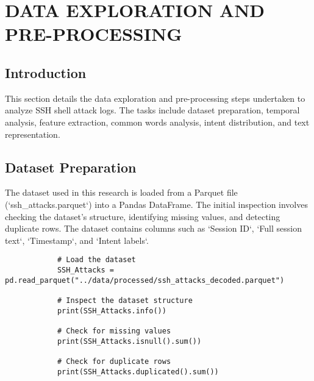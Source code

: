 

\section{DATA EXPLORATION AND PRE-PROCESSING}


    \subsection{Introduction}

        This section details the data exploration and pre-processing steps undertaken to analyze SSH shell attack logs. The tasks include dataset preparation, temporal analysis, feature extraction, common words analysis, intent distribution, and text representation.

    \subsection{Dataset Preparation}
    
        The dataset used in this research is loaded from a Parquet file (`ssh_attacks.parquet`) into a Pandas DataFrame. The initial inspection involves checking the dataset's structure, identifying missing values, and detecting duplicate rows. The dataset contains columns such as `Session ID`, `Full session text`, `Timestamp`, and `Intent labels`.

        \begin{verbatim}
            # Load the dataset
            SSH_Attacks = pd.read_parquet("../data/processed/ssh_attacks_decoded.parquet")
    
            # Inspect the dataset structure
            print(SSH_Attacks.info())
    
            # Check for missing values
            print(SSH_Attacks.isnull().sum())
    
            # Check for duplicate rows
            print(SSH_Attacks.duplicated().sum())
        \end{verbatim}

